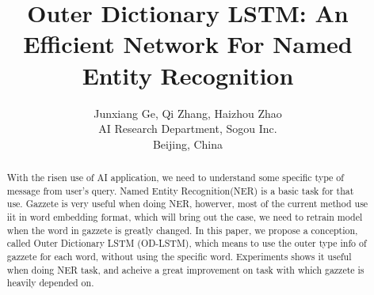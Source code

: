\documentclass[letterpaper]{article} %
\title{ Outer Dictionary LSTM: An Efficient Network For Named Entity Recognition }
\author{Junxiang Ge, Qi Zhang, Haizhou Zhao\\ 
AI Research Department, Sogou Inc. \\
Beijing, China}
\begin{document}
\maketitle

\begin{abstract}
With the risen use of AI application, we need to understand some specific type of message from user's query. Named Entity Recognition(NER) is a basic task for that use. Gazzete is very useful when doing NER, howerver, most of the current method use iit in word embedding format, which will bring out the case, we need to retrain model when the word in gazzete is greatly changed. In this paper, we propose a conception, called Outer Dictionary LSTM (OD-LSTM), which means to use the outer type info of gazzete for each word, without using the specific word. Experiments shows it useful when doing NER task, and acheive a great improvement on task with which gazzete is heavily depended on.
\end{abstract}
\end{document}
